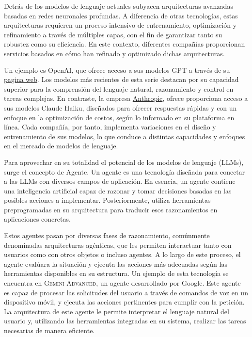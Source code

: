 Detrás de los modelos de lenguaje actuales subyacen arquitecturas avanzadas
basadas en redes neuronales profundas. A diferencia de otras tecnologías, estas
arquitecturas requieren un proceso intensivo de entrenamiento, optimización y
refinamiento a través de múltiples capas, con el fin de garantizar tanto su
robustez como su eficiencia. En este contexto, diferentes compañías proporcionan
servicios basados en cómo han refinado y optimizado dichas arquitecturas.

Un ejemplo es OpenAI, que ofrece acceso a sus modelos GPT a través de su
\href{https://openai.com/}{pagina web}. Los modelos más recientes de esta serie
destacan por su capacidad superior para la comprensión del lenguaje natural,
razonamiento y control en tareas complejas. En contraste, la empresa
\href{https://docs.anthropic.com/es/docs/about-claude/models}{Anthropic}, ofrece
proporciona acceso a sus modelos Claude Haiku, diseñados para ofrecer respuestas
rápidas y con un enfoque en la optimización de costos, según lo informado en su
plataforma en línea. Cada compañía, por tanto, implementa variaciones en el
diseño y entrenamiento de sus modelos, lo que conduce a distintas capacidades y
enfoques en el mercado de modelos de lenguaje.

Para aprovechar en su totalidad el potencial de los modelos de lenguaje (LLMs), surge
el concepto de Agente. Un agente es una tecnología diseñada para conectar a las
LLMs con diversos campos de aplicación. En esencia, un agente contiene una
inteligencia artificial capaz de razonar y tomar decisiones basadas en las
posibles acciones a implementar. Posteriormente, utiliza herramientas
preprogramadas en su arquitectura para traducir esos razonamientos en
aplicaciones concretas.

Estos agentes pasan por diversas fases de razonamiento, comúnmente denominadas
arquitecturas agénticas, que les permiten interactuar tanto con usuarios como
con otros objetos o incluso agentes. A lo largo de este proceso, el agente
evalúara la situación y ejecuta las acciones más adecuadas según las
herramientas disponibles en su estructura. Un ejemplo de esta tecnología se
encuentra en \textsc{Gemini Advanced}, un agente desarrollado por Google. Este
agente es capaz de procesar las solicitudes del usuario a través de comandos de
voz en un dispositivo móvil, y ejecuta las acciones pertinentes para cumplir con
la petición. La arquitectura de este agente le permite interpretar el lenguaje
natural del usuario y, utilizando las herramientas integradas en su sistema,
realizar las tareas necesarias de manera eficiente.

